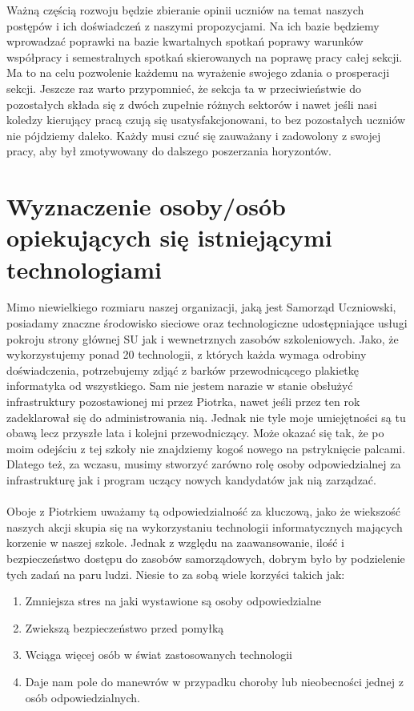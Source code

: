 \documentclass[9pt,a4paper]{report}
\begin{document}
Ważną częścią rozwoju będzie zbieranie opinii uczniów na temat naszych postępów i ich doświadczeń z naszymi propozycjami. Na ich bazie będziemy wprowadzać poprawki na bazie kwartalnych spotkań poprawy warunków współpracy i semestralnych spotkań skierowanych na poprawę pracy całej sekcji. Ma to na celu pozwolenie każdemu na wyrażenie swojego zdania o prosperacji sekcji. Jeszcze raz warto przypomnieć, że sekcja ta w przeciwieństwie do pozostałych składa się z dwóch zupełnie różnych sektorów i nawet jeśli nasi koledzy kierujący pracą czują się usatysfakcjonowani, to bez pozostałych uczniów nie pójdziemy daleko. Każdy musi czuć się zauważany i zadowolony z swojej pracy, aby był zmotywowany do dalszego poszerzania horyzontów.\\

\section{Wyznaczenie osoby/osób opiekujących się istniejącymi technologiami}
\label{section:my}
Mimo niewielkiego rozmiaru naszej organizacji, jaką jest Samorząd Uczniowski, posiadamy znaczne środowisko sieciowe oraz technologiczne udostępniające usługi pokroju strony głównej SU jak i wewnetrznych zasobów szkoleniowych. Jako, że wykorzystujemy ponad 20 technologii, z których każda wymaga odrobiny doświadczenia, potrzebujemy zdjąć z barków przewodnicącego plakietkę informatyka od wszystkiego. Sam nie jestem narazie w stanie obsłużyć infrastruktury pozostawionej mi przez Piotrka, nawet jeśli przez ten rok zadeklarował się do administrowania nią. Jednak nie tyle moje umiejętności są tu obawą lecz przyszłe lata i kolejni przewodniczący. Może okazać się tak, że po moim odejściu z tej szkoły nie znajdziemy kogoś nowego na pstryknięcie palcami. Dlatego też, za wczasu, musimy stworzyć zarówno rolę osoby odpowiedzialnej za infrastrukturę jak i program uczący nowych kandydatów jak nią zarządzać.\\\\
Oboje z Piotrkiem uważamy tą odpowiedzialność za kluczową, jako że wiekszość naszych akcji  skupia się na wykorzystaniu technologii informatycznych mających korzenie w naszej szkole. Jednak z względu na zaawansowanie, ilość i bezpieczeństwo dostępu do zasobów samorządowych, dobrym było by podzielenie tych zadań na paru ludzi. Niesie to za sobą wiele korzyści takich jak:\\
\begin{enumerate}
\item Zmniejsza stres na jaki wystawione są osoby odpowiedzialne
\item Zwiekszą bezpieczeństwo przed pomyłką
\item Wciąga więcej osób w świat zastosowanych technologii
\item Daje nam pole do manewrów w przypadku choroby lub nieobecności jednej z osób odpowiedzialnych.
\end{enumerate}
\end{document}

